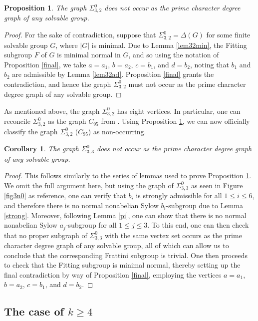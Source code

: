 \documentclass[11pt]{amsart}
\newtheorem{corollary}[theorem]{Corollary}
\newtheorem{proposition}[theorem]{Proposition}
\theoremstyle{definition}
\theoremstyle{remark}
\numberwithin{equation}{section}
\newcommand{\SZ}[2]{\Sigma_{#1,#2}^0} %
\begin{document}
\begin{proposition}\label{prop320}
The graph $\SZ{3}{2}$ does not occur as the prime character degree graph of any solvable group.
\end{proposition}
\begin{proof}
For the sake of contradiction, suppose that $\SZ{3}{2}=\Delta(G)$ for some finite solvable group $G$, where $|G|$ is minimal. Due to Lemma \ref{lem32min}, the Fitting subgroup $F$ of $G$ is minimal normal in $G$, and so using the notation of Proposition \ref{final}, we take $a=a_1$, $b=a_2$, $c=b_1$, and $d=b_2$, noting that $b_1$ and $b_2$ are admissible by Lemma \ref{lem32ad}. Proposition \ref{final} grants the contradiction, and hence the graph $\SZ{3}{2}$ must not occur as the prime character degree graph of any solvable group.
\end{proof}

As mentioned above, the graph $\SZ{3}{2}$ has eight vertices. In particular, one can reconcile $\SZ{3}{2}$ as the graph $C_{95}$ from \cite{LS2}. Using Proposition \ref{prop320}, we can now officially classify the graph $\SZ{3}{2}$ ($C_{95}$) as non-occurring.

\begin{corollary}\label{cor330}
The graph $\SZ{3}{3}$ does not occur as the prime character degree graph of any solvable group.
\end{corollary}
\begin{proof}
This follows similarly to the series of lemmas used to prove Proposition \ref{prop320}. We omit the full argument here, but using the graph of $\SZ{3}{3}$ as seen in Figure \ref{fig3n0} as reference, one can verify that $b_i$ is strongly admissible for all $1\leq i\leq6$, and therefore there is no normal nonabelian Sylow $b_i$-subgroup due to Lemma \ref{strong}. Moreover, following Lemma \ref{pi}, one can show that there is no normal nonabelian Sylow $a_j$-subgroup for all $1\leq j\leq3$. To this end, one can then check that no proper subgraph of $\SZ{3}{3}$ with the same vertex set occurs as the prime character degree graph of any solvable group, all of which can allow us to conclude that the corresponding Frattini subgroup is trivial. One then proceeds to check that the Fitting subgroup is minimal normal, thereby setting up the final contradiction by way of Proposition \ref{final}, employing the vertices $a=a_1$, $b=a_2$, $c=b_1$, and $d=b_2$.
\end{proof}

\subsection{The case of $k\geq4$}%
\end{document}
